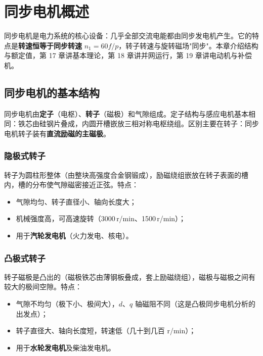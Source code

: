 \chapter{同步电机概述}

同步电机是电力系统的核心设备：几乎全部交流电能都由同步发电机产生。它的特点是\textbf{转速恒等于同步转速} $n_1=60f/p$，转子转速与旋转磁场"同步"。本章介绍结构与额定值，第 17 章讲基本理论，第 18 章讲并网运行，第 19 章讲电动机与补偿机。

\section{同步电机的基本结构}

同步电机由\textbf{定子}（电枢）、\textbf{转子}（磁极）和气隙组成。定子结构与感应电机基本相同：铁芯由硅钢片叠成，内圆开槽嵌放三相对称电枢绕组。区别主要在转子：同步电机转子装有\textbf{直流励磁的主磁极}。

\subsection{隐极式转子}
转子为圆柱形整体（由整块高强度合金钢锻成），励磁绕组嵌放在转子表面的槽内，槽的分布使气隙磁密接近正弦。特点：
\begin{itemize}
  \item 气隙均匀、转子直径小、轴向长度大；
  \item 机械强度高，可高速旋转（3000\,r/min、1500\,r/min）；
  \item 用于\textbf{汽轮发电机}（火力发电、核电）。
\end{itemize}

\subsection{凸极式转子}
转子磁极是凸出的（磁极铁芯由薄钢板叠成，套上励磁绕组），磁极与磁极之间有较大的极间空隙。特点：
\begin{itemize}
  \item 气隙不均匀（极下小、极间大），$d$、$q$ 轴磁阻不同（这是凸极同步电机分析的出发点）；
  \item 转子直径大、轴向长度短，转速低（几十到几百 r/min）；
  \item 用于\textbf{水轮发电机}及柴油发电机。
\end{itemize}

